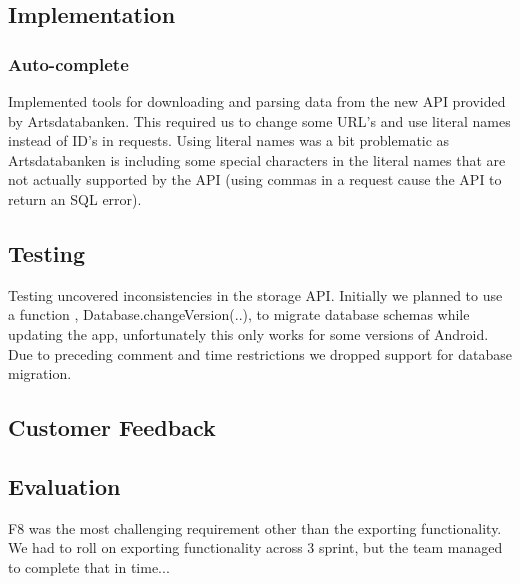 \subsection{Implementation}

	\subsubsection{Auto-complete}

	Implemented tools for downloading and parsing data from the new API
	provided by Artsdatabanken. This required us to change some URL's and use
	literal names instead of ID's in requests. Using literal names was a bit
	problematic as Artsdatabanken is including some special characters in the
	literal names that are not actually supported by the API (using commas in a
	request cause the API to return an SQL error).

\subsection{Testing}

Testing uncovered inconsistencies in the storage API. Initially we planned to
use a function , Database.changeVersion(..), to migrate database schemas while
updating the app, unfortunately this only works for some versions of Android.
Due to preceding comment and time restrictions we dropped support for database
migration.

\subsection{Customer Feedback}

\subsection{Evaluation} 

F8 was the most challenging requirement other than the exporting functionality.
We had to roll on exporting functionality across 3 sprint, but the team managed
to complete that in time... 
